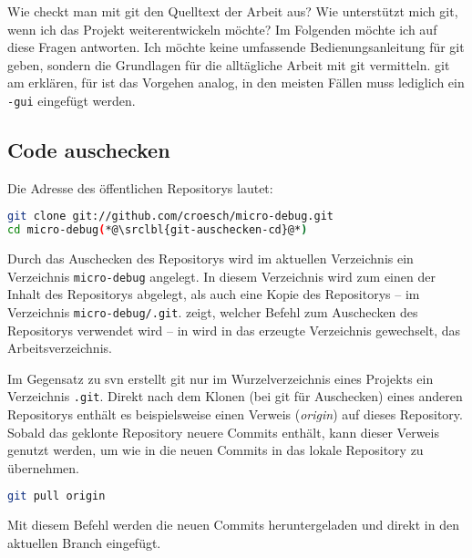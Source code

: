 Wie checkt man mit \gls{git} den Quelltext der Arbeit aus? Wie unterstützt mich \gls{git}, wenn ich das Projekt weiterentwickeln möchte? Im Folgenden möchte ich auf diese Fragen antworten. Ich möchte keine umfassende Bedienungsanleitung für \gls{git} geben, sondern die Grundlagen für die alltägliche Arbeit mit \gls{git} vermitteln. \gls{git} am \md erklären, für \mdg ist das Vorgehen analog, in den meisten Fällen muss lediglich ein \texttt{-gui} eingefügt werden.

\subsection{Code auschecken}
Die Adresse des öffentlichen Repositorys lautet: 

\begin{lstlisting}[language=sh,caption={\md mit git auschecken},label=\lstlbl{git-auschecken}]
git clone git://github.com/croesch/micro-debug.git
cd micro-debug(*@\srclbl{git-auschecken-cd}@*)
\end{lstlisting}

Durch das Auschecken des Repositorys wird im aktuellen Verzeichnis ein Verzeichnis \texttt{micro-debug} angelegt. In diesem Verzeichnis wird zum einen der Inhalt des Repositorys abgelegt, als auch eine Kopie des Repositorys -- im Verzeichnis \texttt{micro-debug/.git}.  zeigt, welcher Befehl zum Auschecken des Repositorys verwendet wird -- in  wird in das erzeugte Verzeichnis gewechselt, das Arbeitsverzeichnis.

Im Gegensatz zu \gls{svn} erstellt \gls{git} nur im Wurzelverzeichnis eines Projekts ein Verzeichnis \texttt{.git}. Direkt nach dem Klonen (bei \gls{git} für Auschecken) eines anderen Repositorys enthält es beispielsweise einen Verweis (\emph{origin}) auf dieses Repository. Sobald das geklonte Repository neuere Commits enthält, kann dieser Verweis genutzt werden, um wie in  die neuen Commits in das lokale Repository zu übernehmen.

\begin{lstlisting}[language=sh,caption={Mit git \emph{pull} auf Originalrepository ausführen},label=\lstlbl{git-pull}]
git pull origin
\end{lstlisting}

Mit diesem Befehl werden die neuen Commits heruntergeladen und direkt in den aktuellen Branch eingefügt.

